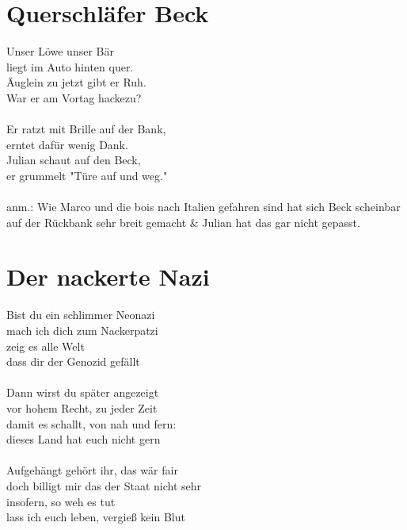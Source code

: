 \documentclass[11pt]{article}
\begin{document}
\filbreak
\section*{Querschläfer Beck}

Unser Löwe unser Bär\\
liegt im Auto hinten quer.\\
Äuglein zu jetzt gibt er Ruh.\\
War er am Vortag hackezu?\\
\\
Er ratzt mit Brille auf der Bank,\\
erntet dafür wenig Dank.\\
Julian schaut auf den Beck,\\
er grummelt "Türe auf und weg."\\
\\
anm.: Wie Marco und die bois nach Italien gefahren sind hat sich Beck scheinbar auf der Rückbank sehr breit gemacht \& Julian hat das gar nicht gepasst.

\section*{Der nackerte Nazi}

Bist du ein schlimmer Neonazi\\
mach ich dich zum Nackerpatzi\\
zeig es alle Welt\\
dass dir der Genozid gefällt\\
\\
Dann wirst du später angezeigt\\
vor hohem Recht, zu jeder Zeit\\
damit es schallt, von nah und fern:\\
dieses Land hat euch nicht gern\\
\\
Aufgehängt gehört ihr, das wär fair\\
doch billigt mir das der Staat nicht sehr\\
insofern, so weh es tut\\
lass ich euch leben, vergieß kein Blut
\end{document}
